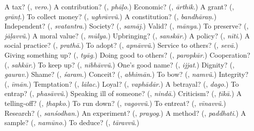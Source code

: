 \begin{tcolorbox}[breakable,colback=teal!4,colframe=teal!35!black,title={Before you move on}]
A tax? (\textbf{}, \emph{vero}.) A contribution? (\textbf{}, \emph{phāḷo}.) Economic? (\textbf{}, \emph{ārthik}.) A grant? (\textbf{}, \emph{grānṭ}.) To collect money? (\textbf{}, \emph{ughrāvvũ}.) A constitution? (\textbf{}, \emph{bandhāraṇ}.) Independent? (\textbf{}, \emph{svatantra}.) Society? (\textbf{}, \emph{samāj}.) Valid? (\textbf{}, \emph{mānya}.) To preserve? (\textbf{}, \emph{jāḷavvũ}.) A moral value? (\textbf{}, \emph{mūlya}.) Upbringing? (\textbf{}, \emph{sanskār}.) A policy? (\textbf{}, \emph{nīti}.) A social practice? (\textbf{}, \emph{prathā}.) To adopt? (\textbf{}, \emph{apnāvvũ}.) Service to others? (\textbf{}, \emph{sevā}.) Giving something up? (\textbf{}, \emph{tyāg}.) Doing good to others? (\textbf{}, \emph{paropkār}.) Cooperation? (\textbf{}, \emph{sahkār}.) To keep up? (\textbf{}, \emph{nibhāvvũ}.) One's good name? (\textbf{}, \emph{ijjat}.) Dignity? (\textbf{}, \emph{gaurav}.) Shame? (\textbf{}, \emph{śaram}.) Conceit? (\textbf{}, \emph{abhimān}.) To bow? (\textbf{}, \emph{namvũ}.) Integrity? (\textbf{}, \emph{īmān}.) Temptation? (\textbf{}, \emph{lālac}.) Loyal? (\textbf{}, \emph{vaphādār}.) A betrayal? (\textbf{}, \emph{dago}.) To entrap? (\textbf{}, \emph{phasāvvũ}.) Speaking ill of someone? (\textbf{}, \emph{nindā}.) Criticism? (\textbf{}, \emph{ṭīkā}.) A telling-off? (\textbf{}, \emph{ṭhapko}.) To run down? (\textbf{}, \emph{vagovvũ}.) To entreat? (\textbf{}, \emph{vīnavvũ}.) Research? (\textbf{}, \emph{sanśodhan}.) An experiment? (\textbf{}, \emph{prayog}.) A method? (\textbf{}, \emph{paddhati}.) A sample? (\textbf{}, \emph{namūno}.) To deduce? (\textbf{}, \emph{tāravvũ}.)
\end{tcolorbox}

